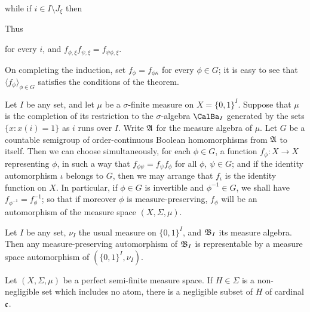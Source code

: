 {\noindent while if $i\in I\setminus J_{\xi}$ then


\noindent Thus


\noindent for every $i$, and
$f_{\phi,\xi}f_{\psi,\xi}=f_{\psi\phi,\xi}$.

On completing the induction, set $f_{\phi}=f_{\phi\kappa}$ for every
$\phi\in G$;  it is easy to see that
$\langle f_{\phi}\rangle_{\phi\in G}$ satisfies the conditions of the
theorem.
}%

 Let $I$ be any set, and let $\mu$ be a
$\sigma$-finite measure on $X=\{0,1\}^I$.   Suppose that $\mu$ is
the completion of its restriction to the
$\sigma$-algebra $\CalBa_I$ generated by the sets $\{x:x(i)=1\}$ as $i$
runs over $I$.  Write $\frak A$ for the measure algebra of $\mu$.
Let $G$ be a countable semigroup of order-continuous Boolean
homomorphisms from $\frak A$ to itself.   Then we can choose
simultaneously, for each $\phi\in G$, a function $f_{\phi}:X\to X$
representing $\phi$, in such a way that $f_{\phi\psi}=f_{\psi}f_{\phi}$
for all $\phi$, $\psi\in G$;  and if the identity automorphism $\iota$
belongs to $G$, then we may arrange that $f_{\iota}$ is the identity
function on $X$.   In particular, if $\phi\in G$ is invertible and
$\phi^{-1}\in G$, we shall have $f_{\phi^{-1}}=f_{\phi}^{-1}$;  so that
if moreover $\phi$ is measure-preserving, $f_{\phi}$ will be an
automorphism of the measure space $(X,\Sigma,\mu)$.


 Let $I$ be any set, $\nu_I$ the usual measure
on $\{0,1\}^{I}$, and $\frak B_I$ its measure algebra.   Then any
measure-preserving automorphism of $\frak B_I$ is representable by a
measure space automorphism of $(\{0,1\}^I,\nu_I)$.


 Let $(X,\Sigma,\mu)$ be a perfect
semi-finite measure space.   If $H\in\Sigma$ is a non-negligible set which
includes no atom, there is a
negligible subset of $H$ of cardinal $\frak c$.

